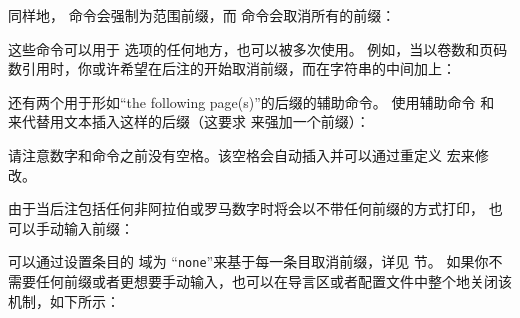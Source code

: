 \begin{ltxexample}
\cite[\pno~27a]{key}
\end{ltxexample}
%
同样地， 命令会强制为范围前缀，而  命令会取消所有的前缀：

\begin{ltxexample}
\cite[\ppno~27a--28c]{key}
\cite[]{key}
\end{ltxexample}
%
这些命令可以用于  选项的任何地方，也可以被多次使用。
例如，当以卷数和页码数引用时，你或许希望在后注的开始取消前缀，而在字符串的中间加上：

\begin{ltxexample}
\cite[VII, \pno~5]{key}
\cite[VII, \pno~3, \ppno~40--45]{key}
\cite[see][\ppno~37--46, in particular \pno~40]{key}
\end{ltxexample}
%
还有两个用于形如“the following page(s)”的后缀的辅助命令。
使用辅助命令  和  来代替用文本插入这样的后缀（这要求  来强加一个前缀）：

\begin{ltxexample}
\cite[\ppno~27~sq.]{key}
\cite[\ppno~55~sqq.]{key}
\end{ltxexample}
%
请注意数字和命令之前没有空格。该空格会自动插入并可以通过重定义  宏来修改。

\begin{ltxexample}
\cite[27\psq]{key}
\cite[55\psqq]{key}
\end{ltxexample}
%
由于当后注包括任何非阿拉伯或罗马数字时将会以不带任何前缀的方式打印，
也可以手动输入前缀：

\begin{ltxexample}
\cite[p.~5]{key}
\end{ltxexample}
%
可以通过设置条目的  域为 “\texttt{none}”来基于每一条目取消前缀，详见  节。
如果你不需要任何前缀或者更想要手动输入，也可以在导言区或者配置文件中整个地关闭该机制，如下所示：

